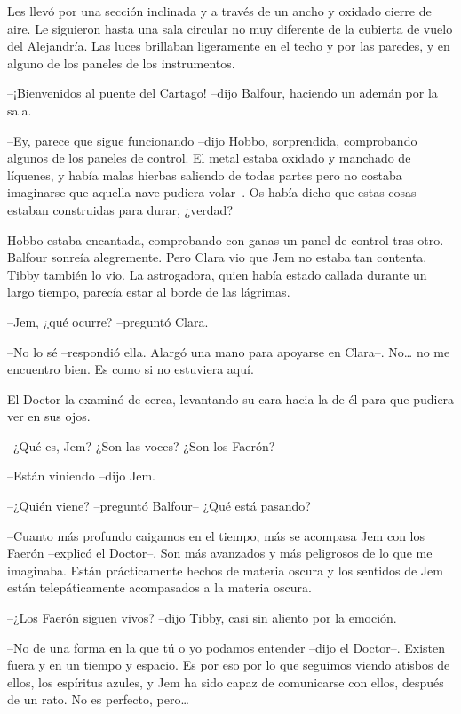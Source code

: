 {Les llevó por una sección inclinada y a través de un ancho y oxidado
 cierre de aire. Le siguieron hasta una sala circular no muy diferente de
 la cubierta de vuelo del Alejandría. Las luces brillaban ligeramente en
 el techo y por las paredes, y en alguno de los paneles de los
instrumentos.}

{--¡Bienvenidos al puente del Cartago! --dijo Balfour, haciendo un ademán
por la sala.}

{--Ey, parece que sigue funcionando --dijo Hobbo, sorprendida,
 comprobando algunos de los paneles de control. El metal estaba oxidado y
 manchado de líquenes, y había malas hierbas saliendo de todas partes
 pero no costaba imaginarse que aquella nave pudiera volar--. Os había
dicho que estas cosas estaban construidas para durar, ¿verdad?}

{Hobbo estaba encantada, comprobando con ganas un panel de control tras
 otro. Balfour sonreía alegremente. Pero Clara vio que Jem no estaba tan
 contenta. Tibby también lo vio. La astrogadora, quien había estado
 callada durante un largo tiempo, parecía estar al borde de las
lágrimas.}

{--Jem, ¿qué ocurre? --preguntó Clara.}

{--No lo sé --respondió ella. Alargó una mano para apoyarse en Clara--.
 No\ldots{} no me encuentro bien. Es como si no estuviera aquí.}

{El Doctor la examinó de cerca, levantando su cara hacia la de él para
que pudiera ver en sus ojos.}

{--¿Qué es, Jem? ¿Son las voces? ¿Son los Faerón?}

{--Están viniendo --dijo Jem.}

{--¿Quién viene? --preguntó Balfour-- ¿Qué está pasando?}

{--Cuanto más profundo caigamos en el tiempo, más se acompasa Jem con los
 Faerón --explicó el Doctor--. Son más avanzados y más peligrosos de lo
 que me imaginaba. Están prácticamente hechos de materia oscura y los
sentidos de Jem están telepáticamente acompasados a la materia oscura.}

{--¿Los Faerón siguen vivos? --dijo Tibby, casi sin aliento por la
emoción.}

{--No de una forma en la que tú o yo podamos entender --dijo el Doctor--.
 Existen fuera y en un tiempo y espacio. Es por eso por lo que seguimos
 viendo atisbos de ellos, los espíritus azules, y Jem ha sido capaz de
 comunicarse con ellos, después de un rato. No es perfecto,
 pero\ldots{}}

